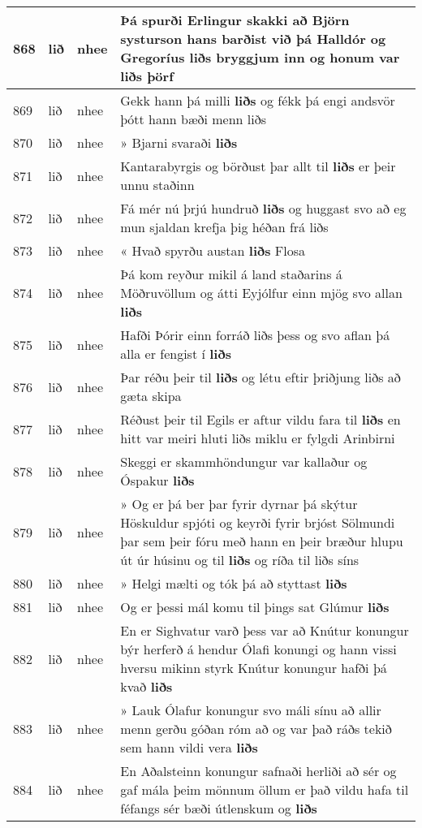 \documentclass{article}
\begin{document}
\begin{longtable}{p{1cm}|p{1cm}|p{1cm}|p{13cm}}
\hline
868&lið&nhee&Þá spurði Erlingur skakki að Björn systurson hans barðist við þá Halldór og Gregoríus \textbf{liðs} bryggjum inn og honum var liðs þörf\\
\hline
869&lið&nhee&Gekk hann þá milli \textbf{liðs} og fékk þá engi andsvör þótt hann bæði menn liðs\\
\hline
870&lið&nhee&» Bjarni svaraði \textbf{liðs} \\
\hline
871&lið&nhee&Kantarabyrgis og börðust þar allt til \textbf{liðs} er þeir unnu staðinn\\
\hline
872&lið&nhee&Fá mér nú þrjú hundruð \textbf{liðs} og huggast svo að eg mun sjaldan krefja þig héðan frá liðs\\
\hline
873&lið&nhee&« Hvað spyrðu austan \textbf{liðs} Flosa\\
\hline
874&lið&nhee&Þá kom reyður mikil á land staðarins á Möðruvöllum og átti Eyjólfur einn mjög svo allan \textbf{liðs} \\
\hline
875&lið&nhee&Hafði Þórir einn forráð liðs þess og svo aflan þá alla er fengist í \textbf{liðs} \\
\hline
876&lið&nhee&Þar réðu þeir til \textbf{liðs} og létu eftir þriðjung liðs að gæta skipa\\
\hline
877&lið&nhee&Réðust þeir til Egils er aftur vildu fara til \textbf{liðs} en hitt var meiri hluti liðs miklu er fylgdi Arinbirni\\
\hline
878&lið&nhee&Skeggi er skammhöndungur var kallaður og Óspakur \textbf{liðs} \\
\hline
879&lið&nhee&» Og er þá ber þar fyrir dyrnar þá skýtur Höskuldur spjóti og keyrði fyrir brjóst Sölmundi þar sem þeir fóru með hann en þeir bræður hlupu út úr húsinu og til \textbf{liðs} og ríða til liðs síns\\
\hline
880&lið&nhee&» Helgi mælti og tók þá að styttast \textbf{liðs} \\
\hline
881&lið&nhee&Og er þessi mál komu til þings sat Glúmur \textbf{liðs} \\
\hline
882&lið&nhee&En er Sighvatur varð þess var að Knútur konungur býr herferð á hendur Ólafi konungi og hann vissi hversu mikinn styrk Knútur konungur hafði þá kvað \textbf{liðs} \\
\hline
883&lið&nhee&» Lauk Ólafur konungur svo máli sínu að allir menn gerðu góðan róm að og var það ráðs tekið sem hann vildi vera \textbf{liðs} \\
\hline
884&lið&nhee&En Aðalsteinn konungur safnaði herliði að sér og gaf mála þeim mönnum öllum er það vildu hafa til féfangs sér bæði útlenskum og \textbf{liðs} \\

\end{longtable}
\end{document}
